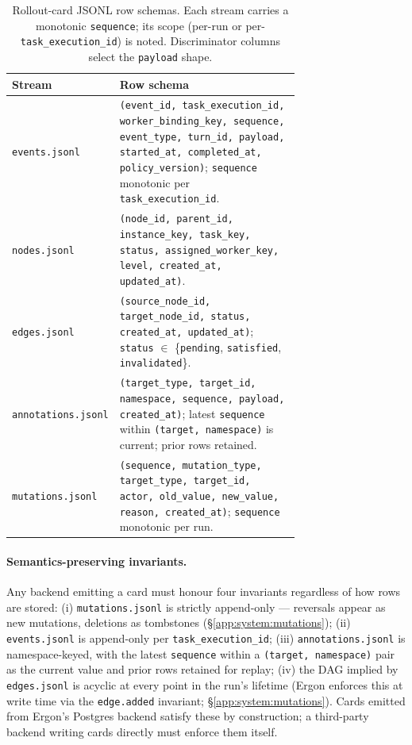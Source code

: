 \documentclass{article}
\begin{document}
\begin{table}[h]
\centering
\small
\caption{Rollout-card JSONL row schemas. Each stream carries a
monotonic \texttt{sequence}; its scope (per-run or
per-\texttt{task\_execution\_id}) is noted. Discriminator
columns select the \texttt{payload} shape.}
\label{tab:rowschemas}
\footnotesize
\setlength{\tabcolsep}{3pt}
\begin{tabular}{@{}l>{\raggedright\arraybackslash}p{0.72\linewidth}@{}}
\toprule
\textbf{Stream} & \textbf{Row schema} \\
\midrule
\texttt{events.jsonl}      & \texttt{(event\_id, task\_execution\_id, worker\_binding\_key, sequence, event\_type, turn\_id, payload, started\_at, completed\_at, policy\_version)}; \texttt{sequence} monotonic per \texttt{task\_execution\_id}. \\
\texttt{nodes.jsonl}       & \texttt{(node\_id, parent\_id, instance\_key, task\_key, status, assigned\_worker\_key, level, created\_at, updated\_at)}. \\
\texttt{edges.jsonl}       & \texttt{(source\_node\_id, target\_node\_id, status, created\_at, updated\_at)}; \texttt{status} $\in$ \{\texttt{pending}, \texttt{satisfied}, \texttt{invalidated}\}. \\
\texttt{annotations.jsonl} & \texttt{(target\_type, target\_id, namespace, sequence, payload, created\_at)}; latest \texttt{sequence} within \texttt{(target, namespace)} is current; prior rows retained. \\
\texttt{mutations.jsonl}   & \texttt{(sequence, mutation\_type, target\_type, target\_id, actor, old\_value, new\_value, reason, created\_at)}; \texttt{sequence} monotonic per run. \\
\bottomrule
\end{tabular}
\end{table}

\paragraph{Semantics-preserving invariants.} Any backend
emitting a card must honour four invariants regardless of how
rows are stored: (i) \texttt{mutations.jsonl} is strictly
append-only --- reversals appear as new mutations, deletions as
tombstones (\S\ref{app:system:mutations}); (ii)
\texttt{events.jsonl} is append-only per
\texttt{task\_execution\_id}; (iii) \texttt{annotations.jsonl}
is namespace-keyed, with the latest \texttt{sequence} within a
\texttt{(target, namespace)} pair as the current value and
prior rows retained for replay; (iv) the DAG implied by
\texttt{edges.jsonl} is acyclic at every point in the run's
lifetime (Ergon enforces this at write time via the
\texttt{edge.added} invariant; \S\ref{app:system:mutations}).
Cards emitted from Ergon's Postgres backend satisfy these by
construction; a third-party backend writing cards directly
must enforce them itself.
\end{document}
